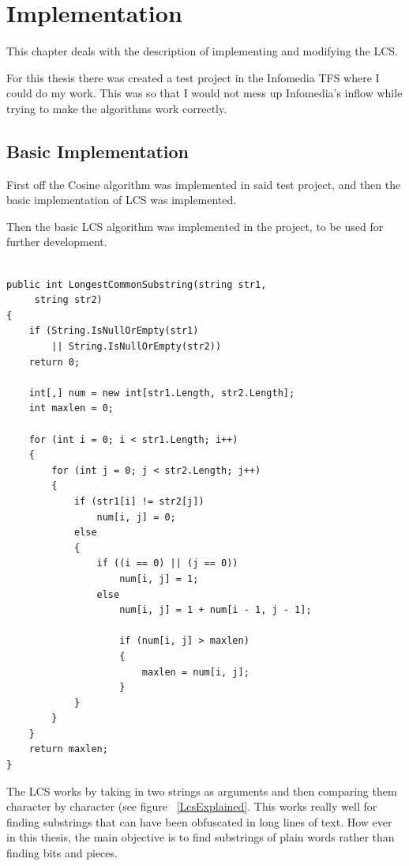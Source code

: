 \chapter{Implementation}

This chapter deals with the description of implementing and modifying the LCS.

For this thesis there was created a test project in the Infomedia TFS where I could do my work. This was so that I would not mess up Infomedia's inflow while trying to make the algorithms work correctly.

\section{Basic Implementation}
First off the Cosine algorithm was implemented in said test project, and then the basic implementation of LCS was implemented.

Then the basic LCS algorithm was implemented in the project, to be used for further development.

\lstset{style=sharpc}
\begin{lstlisting}[caption=Basic LCS implementation in C$^\sharp$, captionpos=b]

public int LongestCommonSubstring(string str1,
	 string str2)
{
    if (String.IsNullOrEmpty(str1) 
    	|| String.IsNullOrEmpty(str2))
    return 0;
	
	int[,] num = new int[str1.Length, str2.Length];
	int maxlen = 0;

    for (int i = 0; i < str1.Length; i++)
  	{
    	for (int j = 0; j < str2.Length; j++)
        {
        	if (str1[i] != str2[j])
            	num[i, j] = 0;
            else
            {
            	if ((i == 0) || (j == 0))
                	num[i, j] = 1;
                else
                    num[i, j] = 1 + num[i - 1, j - 1];

                    if (num[i, j] > maxlen)
                    {
                    	maxlen = num[i, j];
                  	}
           	}
     	}
	}
    return maxlen;
}

\end{lstlisting}

The LCS works by taking in two strings as arguments and then comparing them character by character (see figure ~\ref{LcsExplained}. This works really well for finding substrings that can have been obfuscated in long lines of text. How ever in this thesis, the main objective is to find substrings of plain words rather than finding bits and pieces.

